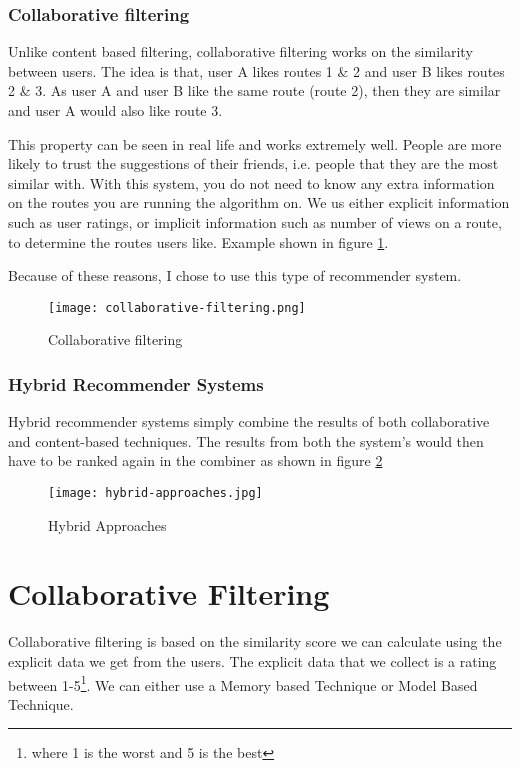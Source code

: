 \subsubsection{Collaborative filtering}
Unlike content based filtering, collaborative filtering works on the similarity between users. The idea is that, user A likes routes 1 \& 2 and user B likes routes 2 \& 3. As user A and user B like the same route (route 2), then they are similar and user A would also like route 3. 

This property can be seen in real life and works extremely well. People are more likely to trust the suggestions of their friends, i.e. people that they are the most similar with. With this system, you do not need to know any extra information on the routes you are running the algorithm on. We us either explicit information such as user ratings, or implicit information such as number of views on a route, to determine the routes users like. Example shown in figure \ref{fig:collaborativeFiltering}.

Because of these reasons, I chose to use this type of recommender system.

\begin{figure}[ht]
    \centering
    \texttt{[image: collaborative-filtering.png]}
    \caption{Collaborative filtering}
    \label{fig:collaborativeFiltering}
\end{figure}

\subsubsection{Hybrid Recommender Systems}
Hybrid recommender systems simply combine the results of both collaborative and content-based techniques. The results from both the system's would then have to be ranked again in the combiner as shown in figure \ref{fig:hybridRecommenderSystems}

\begin{figure}[ht]
    \centering
    \texttt{[image: hybrid-approaches.jpg]}
    \caption{Hybrid Approaches}
    \label{fig:hybridRecommenderSystems}
\end{figure}


\section{Collaborative Filtering}
Collaborative filtering is based on the similarity score we can calculate using the explicit data we get from the users. The explicit data that we collect is a rating between 1-5\footnote{where 1 is the worst and 5 is the best}. We can either use a Memory based Technique or Model Based Technique.

